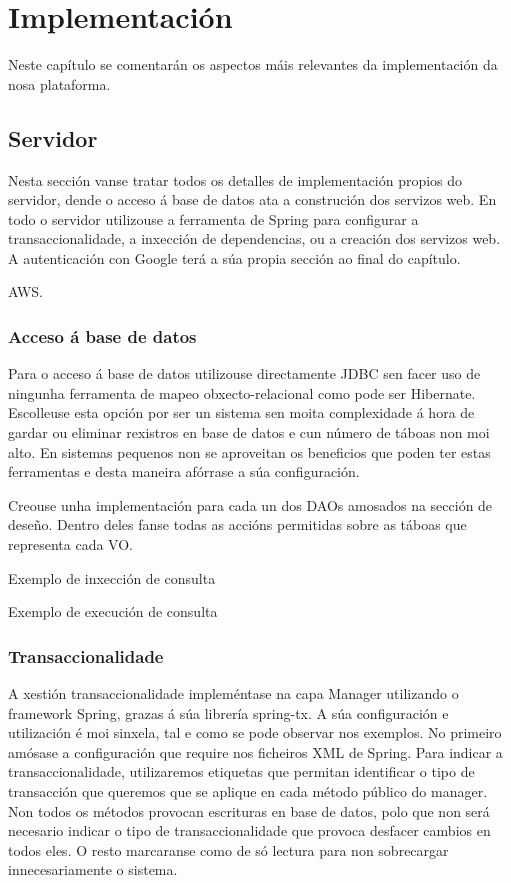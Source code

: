 \chapter{Implementación}

Neste capítulo se comentarán os aspectos máis relevantes da implementación da nosa plataforma.


\section{Servidor}
Nesta sección vanse tratar todos os detalles de implementación propios do servidor, dende o acceso á base de datos ata a construción dos servizos web. En todo o servidor utilizouse a ferramenta de Spring para configurar a transaccionalidade, a inxección de dependencias, ou a creación dos servizos web.
A autenticación con Google terá a súa propia sección ao final do capítulo.


AWS.

\subsection{Acceso á base de datos}
Para o acceso á base de datos utilizouse directamente JDBC sen facer uso de ningunha ferramenta de mapeo obxecto-relacional como pode ser Hibernate. Escolleuse esta opción por ser un sistema sen moita complexidade á hora de gardar ou eliminar rexistros en base de datos e cun número de táboas non moi alto. En sistemas pequenos non se aproveitan os beneficios que poden ter estas ferramentas e desta maneira afórrase a súa configuración.

Creouse unha implementación para cada un dos DAOs amosados na sección de deseño. Dentro deles fanse todas as accións permitidas sobre as táboas que representa cada VO.

Exemplo de inxección de consulta

Exemplo de execución de consulta








\subsection{Transaccionalidade}
A xestión transaccionalidade impleméntase na capa Manager utilizando o framework Spring, grazas á súa librería spring-tx. A súa configuración e utilización é moi sinxela, tal e como se pode observar nos exemplos. No primeiro amósase a configuración que require nos ficheiros XML de Spring. Para indicar a transaccionalidade, utilizaremos etiquetas que permitan identificar o tipo de transacción que queremos que se aplique en cada método público do manager. Non todos os métodos provocan escrituras en base de datos, polo que non será necesario indicar o tipo de transaccionalidade que provoca desfacer cambios en todos eles. O resto marcaranse como de só lectura para non sobrecargar innecesariamente o sistema.

